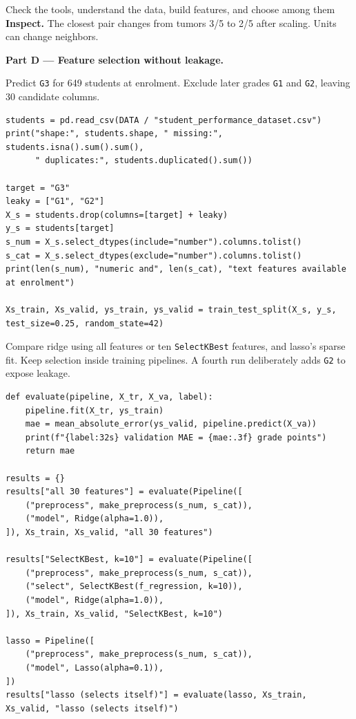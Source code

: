 \begin{labproject}{Check the tools, understand the data, build features, and choose among them}
\textbf{Inspect.} The closest pair changes from tumors 3/5 to 2/5 after scaling. Units can change neighbors.

\medskip\noindent\textbf{Part D --- Feature selection without leakage.}\par

Predict \texttt{G3} for 649 students at enrolment. Exclude later grades \texttt{G1} and \texttt{G2}, leaving 30 candidate columns.

\begin{lstlisting}[style=utppython]
students = pd.read_csv(DATA / "student_performance_dataset.csv")
print("shape:", students.shape, " missing:", students.isna().sum().sum(),
      " duplicates:", students.duplicated().sum())

target = "G3"
leaky = ["G1", "G2"]
X_s = students.drop(columns=[target] + leaky)
y_s = students[target]
s_num = X_s.select_dtypes(include="number").columns.tolist()
s_cat = X_s.select_dtypes(exclude="number").columns.tolist()
print(len(s_num), "numeric and", len(s_cat), "text features available at enrolment")

Xs_train, Xs_valid, ys_train, ys_valid = train_test_split(X_s, y_s, test_size=0.25, random_state=42)
\end{lstlisting}

Compare ridge using all features or ten \texttt{SelectKBest} features, and lasso's sparse fit. Keep selection inside training pipelines. A fourth run deliberately adds \texttt{G2} to expose leakage.

\begin{lstlisting}[style=utppython]
def evaluate(pipeline, X_tr, X_va, label):
    pipeline.fit(X_tr, ys_train)
    mae = mean_absolute_error(ys_valid, pipeline.predict(X_va))
    print(f"{label:32s} validation MAE = {mae:.3f} grade points")
    return mae

results = {}
results["all 30 features"] = evaluate(Pipeline([
    ("preprocess", make_preprocess(s_num, s_cat)),
    ("model", Ridge(alpha=1.0)),
]), Xs_train, Xs_valid, "all 30 features")

results["SelectKBest, k=10"] = evaluate(Pipeline([
    ("preprocess", make_preprocess(s_num, s_cat)),
    ("select", SelectKBest(f_regression, k=10)),
    ("model", Ridge(alpha=1.0)),
]), Xs_train, Xs_valid, "SelectKBest, k=10")

lasso = Pipeline([
    ("preprocess", make_preprocess(s_num, s_cat)),
    ("model", Lasso(alpha=0.1)),
])
results["lasso (selects itself)"] = evaluate(lasso, Xs_train, Xs_valid, "lasso (selects itself)")


\end{lstlisting}
\end{labproject}
